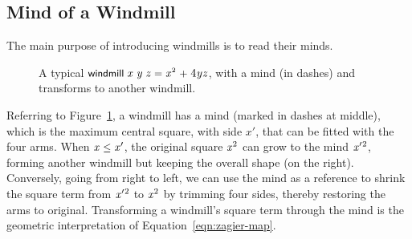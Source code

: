 \documentclass[sigplan,screen]{acmart}
\newcommand{\m}[1]{\todo[fancyline,color=blue!40,size=\scriptsize]{\textsf{JC: #1}}} %
\renewcommand{\HOLinline}[1]{\ensuremath{#1}} %
\renewcommand{\HOLConst}[1]{{\fontsize{9pt}{1em}\selectfont\textsf{\upshape #1}}}
\renewcommand{\HOLNumLit}[1]{{\selectfont\textrm{\upshape #1}}} %
\renewcommand{\HOLSymConst}[1]{{\fontsize{9pt}{1em}\selectfont\textsf{\upshape #1}}}
\newcommand{\windmill}[5]
{
\draw[fill=blue!30!white] %
     (#1,#2+#3) -- (#1,#2+#3+#5) -- (#1+#4,#2+#3+#5) -- (#1+#4,#2+#3)  -- (#1,#2+#3);
\draw[fill=blue!30!white] %
     (#1+#3,#2+#3) -- (#1+#3,#2+#3-#4) -- (#1+#3+#5,#2+#3-#4) -- (#1+#3+#5,#2+#3) -- (#1+#3,#2+#3);
\draw[fill=blue!30!white] %
     (#1+#3,#2) -- (#1+#3,#2-#5) -- (#1+#3-#4,#2-#5) -- (#1+#3-#4,#2)  -- (#1+#3,#2);
\draw[fill=blue!30!white] %
     (#1,#2) -- (#1,#2+#4) -- (#1-#5,#2+#4) -- (#1-#5,#2) -- (#1,#2);
\draw[fill=pink!40!white] %
     (#1,#2) -- (#1,#2+#3) -- (#1+#3,#2+#3) -- (#1+#3,#2) -- (#1,#2);
}
\newcommand{\mind}[4][dashed, ultra thick] %
{
\draw[#1] (#2,#3) -- (#2,#3+#4) -- (#2+#4,#3+#4) -- (#2+#4,#3) -- (#2,#3); 
}
\begin{document}
\subsection{Mind of a Windmill}
\label{sec:windmill-mind}
The main purpose of introducing windmills is to read their minds.

\begin{figure}[h] %
\begin{center}
\caption{A typical \HOLinline{\HOLConst{windmill}\;\HOLFreeVar{x}\;\HOLFreeVar{y}\;\HOLFreeVar{z}\;\HOLSymConst{=}\;\HOLFreeVar{x}\HOLSymConst{\ensuremath{\sp{2}}}\;\HOLSymConst{\ensuremath{+}}\;\HOLNumLit{4}\HOLSymConst{\ensuremath{}}\HOLFreeVar{y}\HOLSymConst{\ensuremath{}}\HOLFreeVar{z}}, with a mind (in dashes) and transforms to another windmill.}
\label{fig:windmill-mind} %
\end{center}
\end{figure}

Referring to Figure~\ref{fig:windmill-mind}, a windmill has a mind (marked in dashes at middle), which is the maximum central square, with side $x'$, that can be fitted with the four arms.
When \HOLinline{\HOLFreeVar{x}\;\HOLSymConst{\HOLTokenLeq{}}\;\ensuremath{\HOLFreeVar{x}\sp{\prime{}}}}, the original square \HOLinline{\HOLFreeVar{x}\ensuremath{{\sp{\HOLNumLit{2}}}}} can grow to the mind \HOLinline{\ensuremath{\HOLFreeVar{x}\sp{\prime{}}}\ensuremath{{\sp{\HOLNumLit{2}}}}}, forming another windmill but keeping the overall shape (on the right).
Conversely, going from right to left, we can use the mind as a reference to shrink the square term from \HOLinline{\ensuremath{\HOLFreeVar{x}\sp{\prime{}}}\ensuremath{{\sp{\HOLNumLit{2}}}}} to \HOLinline{\HOLFreeVar{x}\ensuremath{{\sp{\HOLNumLit{2}}}}} by trimming four sides,
thereby restoring the arms to original.
Transforming a windmill's square term through the mind is the geometric interpretation of Equation~\eqref{eqn:zagier-map}.
\end{document}
